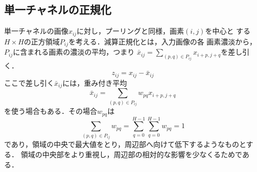 \documentclass[a4paper,10pt]{jsarticle}
\begin{document}



\subsection{単一チャネルの正規化}
単一チャネルの画像$x_{ij}$に対し，プーリングと同様，画素$(i,j)$を中心と
する$H\times H$の正方領域$P_{ij}$を考える．減算正規化とは，入力画像の各
画素濃淡から，$P_{ij}$に含まれる画素の濃淡の平均，つまり
$\bar{x}_{ij}= \sum_{(p,q)\in{P_{ij}}}^{} x_{i+p,j+q}$を差し引く．
\begin{equation}
 z_{ij} = x_{ij}-\bar{x}_{ij}
\end{equation}
ここで差し引く$\bar{x}_{ij}$には，重み付き平均
\begin{equation}
 \bar{x}_{ij}=\sum_{(p,q)\in{P_{ij}}} w_{pq}x_{i+p,j+q}
\end{equation}
を使う場合もある．その場合$w_{pq}$は
\begin{equation}
  \sum_{(p,q)\in{P_{ij}}}^{} w_{pq} = \sum_{q=0}^{H-1} \sum_{q=0}^{H-1} w_{pq}=1
\end{equation}
であり，領域の中央で最大値をとり，周辺部へ向けて低下するようなものとする．
領域の中央部をより重視し，周辺部の相対的な影響を少なくるためである．
\end{document}
